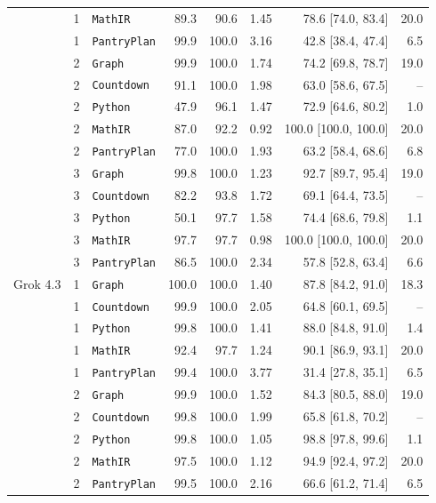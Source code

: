 \begin{longtable}{@{}lrlrrrrr@{}}
     & 1 & \texttt{MathIR} & 89.3 & 90.6 & 1.45 & 78.6 [74.0, 83.4] & 20.0 \\
     & 1 & \texttt{PantryPlan} & 99.9 & 100.0 & 3.16 & 42.8 [38.4, 47.4] & 6.5 \\
     & 2 & \texttt{Graph} & 99.9 & 100.0 & 1.74 & 74.2 [69.8, 78.7] & 19.0 \\
     & 2 & \texttt{Countdown} & 91.1 & 100.0 & 1.98 & 63.0 [58.6, 67.5] & -- \\
     & 2 & \texttt{Python} & 47.9 & 96.1 & 1.47 & 72.9 [64.6, 80.2] & 1.0 \\
     & 2 & \texttt{MathIR} & 87.0 & 92.2 & 0.92 & 100.0 [100.0, 100.0] & 20.0 \\
     & 2 & \texttt{PantryPlan} & 77.0 & 100.0 & 1.93 & 63.2 [58.4, 68.6] & 6.8 \\
     & 3 & \texttt{Graph} & 99.8 & 100.0 & 1.23 & 92.7 [89.7, 95.4] & 19.0 \\
     & 3 & \texttt{Countdown} & 82.2 & 93.8 & 1.72 & 69.1 [64.4, 73.5] & -- \\
     & 3 & \texttt{Python} & 50.1 & 97.7 & 1.58 & 74.4 [68.6, 79.8] & 1.1 \\
     & 3 & \texttt{MathIR} & 97.7 & 97.7 & 0.98 & 100.0 [100.0, 100.0] & 20.0 \\
     & 3 & \texttt{PantryPlan} & 86.5 & 100.0 & 2.34 & 57.8 [52.8, 63.4] & 6.6 \\
    \addlinespace[2pt]
    Grok 4.3 & 1 & \texttt{Graph} & 100.0 & 100.0 & 1.40 & 87.8 [84.2, 91.0] & 18.3 \\
     & 1 & \texttt{Countdown} & 99.9 & 100.0 & 2.05 & 64.8 [60.1, 69.5] & -- \\
     & 1 & \texttt{Python} & 99.8 & 100.0 & 1.41 & 88.0 [84.8, 91.0] & 1.4 \\
     & 1 & \texttt{MathIR} & 92.4 & 97.7 & 1.24 & 90.1 [86.9, 93.1] & 20.0 \\
     & 1 & \texttt{PantryPlan} & 99.4 & 100.0 & 3.77 & 31.4 [27.8, 35.1] & 6.5 \\
     & 2 & \texttt{Graph} & 99.9 & 100.0 & 1.52 & 84.3 [80.5, 88.0] & 19.0 \\
     & 2 & \texttt{Countdown} & 99.8 & 100.0 & 1.99 & 65.8 [61.8, 70.2] & -- \\
     & 2 & \texttt{Python} & 99.8 & 100.0 & 1.05 & 98.8 [97.8, 99.6] & 1.1 \\
     & 2 & \texttt{MathIR} & 97.5 & 100.0 & 1.12 & 94.9 [92.4, 97.2] & 20.0 \\
     & 2 & \texttt{PantryPlan} & 99.5 & 100.0 & 2.16 & 66.6 [61.2, 71.4] & 6.5 \\

\end{longtable}
